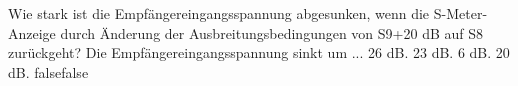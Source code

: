     {Wie stark ist die Empfängereingangsspannung abgesunken, wenn die S-Meter-Anzeige durch Änderung der Ausbreitungsbedingungen von S9+20 dB auf S8 zurückgeht? Die Empfängereingangsspannung sinkt um ...}
    {26 dB.}
    {23 dB.}
    {6 dB.}
    {20 dB.}
    {false}{false}